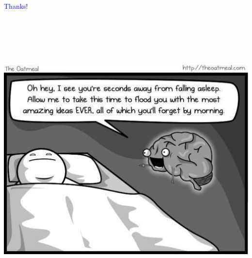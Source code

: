 \documentclass[landscape]{slides}
\begin{document}
\begin{slide}

    \textcolor{blue}{\Large{Thanks!}}

    \begin{center}
        \includegraphics[height=15.5cm]{oatmeal-sleep-brain}
    \end{center}

\end{slide}
\end{document}
